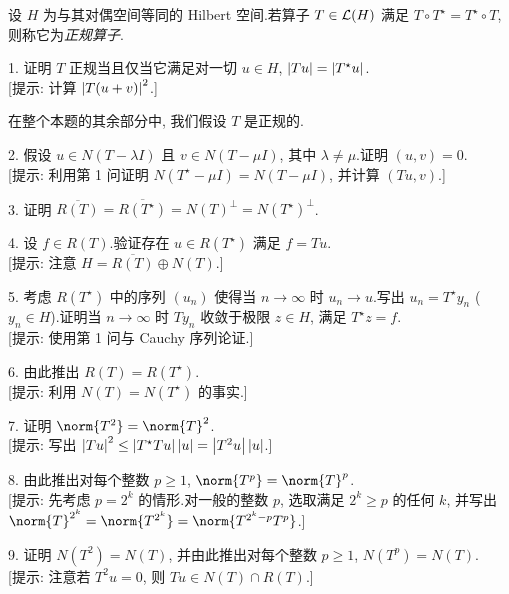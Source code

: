 \begin{problem}[第 2, 4, 5, 6 章]
\label{prob:43}
设 $H$ 为与其对偶空间等同的 Hilbert 空间.若算子 $T\in\mathcal{L}(H)$ 满足
$T\circ T^\star=T^\star\circ T$, 则称它为\emph{正规算子}.

1. 证明 $T$ 正规当且仅当它满足对一切 $u\in H$, $\left|Tu\right|=\left|T^\star u\right|$.\\
{[提示: 计算 $\left|T(u+v)\right|^2$.]}

在整个本题的其余部分中, 我们假设 $T$ 是正规的.

2. 假设 $u\in N(T-\lambda I)$ 且 $v\in N(T-\mu I)$, 其中 $\lambda\ne\mu$.证明
$(u,v)=0$.\\
{[提示: 利用第 1 问证明 $N(T^\star-\mu I)=N(T-\mu I)$, 并计算 $(Tu,v)$.]}

3. 证明 $\overline{R(T)}=\overline{R(T^\star)}=N(T)^\perp=N(T^\star)^\perp$.

4. 设 $f\in R(T)$.验证存在 $u\in R(T^\star)$ 满足 $f=Tu$.\\
{[提示: 注意 $H=\overline{R(T)}\oplus N(T)$.]}

5. 考虑 $R(T^\star)$ 中的序列 $(u_n)$ 使得当 $n\to\infty$ 时 $u_n\to u$.写出
$u_n=T^\star y_n$ ($y_n\in H$).证明当 $n\to\infty$ 时 $Ty_n$ 收敛于极限 $z\in H$,
满足 $T^\star z=f$.\\
{[提示: 使用第 1 问与 Cauchy 序列论证.]}

6. 由此推出 $R(T)=R(T^\star)$.\\
{[提示: 利用 $N(T)=N(T^\star)$ 的事实.]}

7. 证明 $\norm{T^2}=\norm{T}^2$.\\
{[提示: 写出 $\left|Tu\right|^2\le\left|T^\star Tu\right|\left|u\right|=\left|T^2u\right|\left|u\right|$.]}

8. 由此推出对每个整数 $p\ge1$, $\norm{T^p}=\norm{T}^p$.\\
{[提示: 先考虑 $p=2^k$ 的情形.对一般的整数 $p$, 选取满足 $2^k\ge p$ 的任何 $k$,
并写出 $\norm{T}^{2^k}=\norm{T^{2^k}}=\norm{T^{2^k-p}T^p}$.]}

9. 证明 $N(T^2)=N(T)$, 并由此推出对每个整数 $p\ge1$, $N(T^p)=N(T)$.\\
{[提示: 注意若 $T^2u=0$, 则 $Tu\in N(T)\cap R(T)$.]}
\end{problem}

